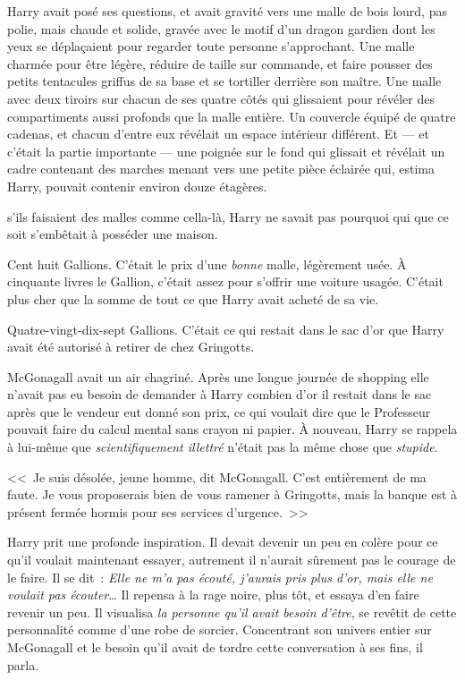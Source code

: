 Harry avait posé ses questions, et avait gravité vers une malle de bois lourd, pas polie, mais chaude et solide, gravée avec le motif d'un dragon gardien dont les yeux se déplaçaient pour regarder toute personne s'approchant. Une malle charmée pour être légère, réduire de taille sur commande, et faire pousser des petits tentacules griffus de sa base et se tortiller derrière son maître. Une malle avec deux tiroirs sur chacun de ses quatre côtés qui glissaient pour révéler des compartiments aussi profonds que la malle entière. Un couvercle équipé de quatre cadenas, et chacun d'entre eux révélait un espace intérieur différent. Et — et c'était la partie importante — une poignée sur le fond qui glissait et révélait un cadre contenant des marches menant vers une petite pièce éclairée qui, estima Harry, pouvait contenir environ douze étagères.

s'ils faisaient des malles comme cella-là, Harry ne savait pas pourquoi qui que ce soit s'embêtait à posséder une maison.

Cent huit Gallions. C'était le prix d'une \emph{bonne} malle, légèrement usée. À cinquante livres le Gallion, c'était assez pour s'offrir une voiture usagée. C'était plus cher que la somme de tout ce que Harry avait acheté de sa vie.

Quatre-vingt-dix-sept Gallions. C'était ce qui restait dans le sac d'or que Harry avait été autorisé à retirer de chez Gringotts.

McGonagall avait un air chagriné. Après une longue journée de shopping elle n'avait pas eu besoin de demander à Harry combien d'or il restait dans le sac après que le vendeur eut donné son prix, ce qui voulait dire que le Professeur pouvait faire du calcul mental sans crayon ni papier. À nouveau, Harry se rappela à lui-même que \emph{scientifiquement illettré} n'était pas la même chose que \emph{stupide}.

<<~Je suis désolée, jeune homme, dit McGonagall. C'est entièrement de ma faute. Je vous proposerais bien de vous ramener à Gringotts, mais la banque est à présent fermée hormis pour ses services d'urgence.~>>

Harry prit une profonde inspiration. Il devait devenir un peu en colère pour ce qu'il voulait maintenant essayer, autrement il n'aurait sûrement pas le courage de le faire. Il se dit~: \emph{Elle ne m'a pas écouté, j'aurais pris plus d'or, mais elle ne voulait pas écouter}… Il repensa à la rage noire, plus tôt, et essaya d'en faire revenir un peu. Il visualisa \emph{la personne qu'il avait besoin d'être}, se revêtit de cette personnalité comme d'une robe de sorcier. Concentrant son univers entier sur McGonagall et le besoin qu'il avait de tordre cette conversation à ses fins, il parla.

